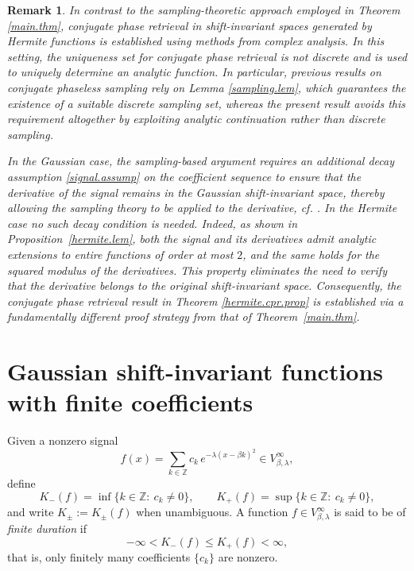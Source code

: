 \documentclass[11pt,oneside,reqno]{amsart}
\newtheorem{remark}[thm]{Remark}
\numberwithin{equation}{section}
\begin{document}
\begin{remark}  In contrast to the sampling-theoretic approach employed in Theorem \ref{main.thm}, conjugate phase retrieval in shift-invariant spaces generated by Hermite functions is established using methods from complex analysis. In this setting, the uniqueness set for conjugate phase retrieval is not discrete and is used to uniquely determine an analytic function. In particular, previous results on conjugate phaseless sampling rely on Lemma \ref{sampling.lem}, which guarantees the existence of a suitable discrete sampling set, whereas the present result avoids this requirement altogether by exploiting analytic continuation rather than discrete sampling.

In the Gaussian case, the sampling-based argument requires an additional decay assumption \eqref{signal.assump} on the coefficient sequence to ensure that the derivative of the signal remains in the  Gaussian shift-invariant space, thereby allowing the sampling theory to be applied to the derivative, cf. \cite{GRS2020}. In  the Hermite case no such decay condition is needed. Indeed, as
shown in Proposition~\ref{hermite.lem}, both the signal and its derivatives admit
analytic extensions to entire functions of order at most $2$, and the same holds
for the squared modulus of the derivatives. This property eliminates
the need to verify that the derivative belongs to the original shift-invariant space. Consequently, the conjugate phase retrieval result in
Theorem \ref{hermite.cpr.prop} is established via a fundamentally different proof strategy from that of Theorem~\ref{main.thm}.




\end{remark}



\medskip



\section{Gaussian shift-invariant functions  with finite coefficients}\label{spec.sec}

\medskip 

Given a nonzero signal
\[
f(x)=\sum_{k\in\mathbb Z} c_k\, e^{-\lambda(x-\beta k)^2}\in V^{\infty}_{\beta,\lambda},
\]
define
\begin{equation}\label{Kpm.def}
K_-(f)=\inf\{k\in\mathbb Z:\ c_k\neq 0\},
\qquad
K_+(f)=\sup\{k\in\mathbb Z:\ c_k\neq 0\},
\end{equation}
and write $K_\pm:=K_\pm(f)$ when unambiguous.   
A function $f\in V^\infty_{\beta,\lambda}$ is said to be of \emph{finite duration} if
\[
-\infty<K_-(f)\le K_+(f)<\infty,
\]
that is, only finitely many coefficients $\{c_k\}$ are nonzero.
\end{document}
